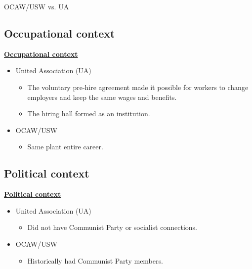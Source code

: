 \documentclass{beamer}
\begin{document}
\begin{frame}{OCAW/USW vs. UA}
\subsection*{Occupational context}
\underline{\textbf{Occupational context}}
	\begin{itemize}
		\item United Association (UA)
		\begin{itemize}
			\item The voluntary pre-hire agreement made it possible for workers to change employers and keep the same wages and benefits. %
			\item The hiring hall formed as an institution.
		\end{itemize}
		\item OCAW/USW
			\begin{itemize}
				\item Same plant entire career.
			\end{itemize}
	\end{itemize}
\subsection*{Political context}
\underline{\textbf{Political context}}
	\begin{itemize}
		\item United Association (UA)
		\begin{itemize}
			\item Did not have Communist Party or socialist connections.
		\end{itemize}
		\item OCAW/USW
			\begin{itemize}
				\item Historically had Communist Party members.
			\end{itemize}
	\end{itemize}
\end{frame}
\end{document}
